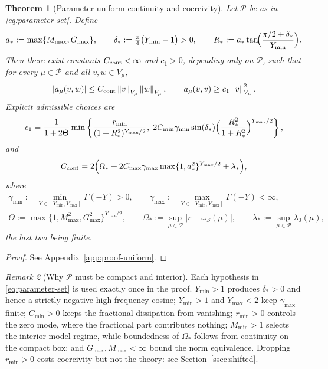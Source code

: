 \documentclass[11pt]{amsart}
\newtheorem{theorem}{Theorem}[section]
\theoremstyle{remark}
\newtheorem{remark}[theorem]{Remark}
\newcommand{\Pset}{\mathcal{P}}
\newcommand{\Vmu}{V_{\mu}}
\newcommand{\norm}[1]{\left\lVert #1\right\rVert}
\newcommand{\rf}{r}
\begin{document}
\begin{theorem}[Parameter-uniform continuity and coercivity]
\label{thm:uniform-coercivity}
Let $\Pset$ be as in \eqref{eq:parameter-set}.  Define
\begin{equation}
  a_\ast:=\max\{M_{\max},G_{\max}\},
  \qquad
  \delta_\ast:=\tfrac{\pi}{4}\bigl(Y_{\min}-1\bigr)>0,
  \qquad
  R_\ast:=a_\ast\tan\!\Bigl(\frac{\pi/2+\delta_\ast}{Y_{\min}}\Bigr).
  \label{eq:uniform-constants-aux}
\end{equation}
Then there exist constants $C_{\rm cont}<\infty$ and $c_1>0$, depending only
on $\Pset$, such that for every $\mu\in\Pset$ and all $v,w\in\Vmu$,
\begin{equation}
  |a_\mu(v,w)|\le C_{\rm cont}\norm{v}_{\Vmu}\norm{w}_{\Vmu},
  \qquad
  a_\mu(v,v)\ge c_1\norm{v}_{\Vmu}^2 .
  \label{eq:uniform-coercivity}
\end{equation}
Explicit admissible choices are
\begin{equation}
  c_1
  =\frac{1}{1+2\Theta}
  \min\left\{
    \frac{r_{\min}}{(1+R_\ast^2)^{Y_{\max}/2}},\;
    2C_{\min}\gamma_{\min}\sin(\delta_\ast)
    \Bigl(\frac{R_\ast^2}{1+R_\ast^2}\Bigr)^{Y_{\max}/2}
  \right\},
  \label{eq:c1-explicit}
\end{equation}
and
\begin{equation}
  C_{\rm cont}
  =2\Bigl(
    \Omega_\ast
    +2C_{\max}\gamma_{\max}\max\{1,a_\ast^2\}^{Y_{\max}/2}
    +\lambda_\ast
  \Bigr),
  \label{eq:Ccont-explicit}
\end{equation}
where
\begin{equation}
\begin{gathered}
\gamma_{\min}:=\!\!\min_{Y\in[Y_{\min},Y_{\max}]}\!\!\Gamma(-Y)>0,
\qquad
\gamma_{\max}:=\!\!\max_{Y\in[Y_{\min},Y_{\max}]}\!\!\Gamma(-Y)<\infty,
\\
\Theta:=\max\{1,M_{\max}^2,G_{\max}^2\}^{Y_{\max}/2},
\qquad
\Omega_\ast:=\sup_{\mu\in\Pset}|\rf-\omega_S(\mu)|,
\qquad
\lambda_\ast:=\sup_{\mu\in\Pset}\lambda_0(\mu),
\end{gathered}
\label{eq:uniform-aux-constants}
\end{equation}
the last two being finite.
\end{theorem}

\begin{proof}
See Appendix~\ref{app:proof-uniform}.
\end{proof}

\begin{remark}[Why $\Pset$ must be compact and interior]
\label{rem:why-compact}
Each hypothesis in \eqref{eq:parameter-set} is used exactly once in the proof.
$Y_{\min}>1$ produces $\delta_\ast>0$ and hence a strictly negative
high-frequency cosine; $Y_{\min}>1$ and $Y_{\max}<2$ keep $\gamma_{\max}$ finite; $C_{\min}>0$
keeps the fractional dissipation from vanishing; $r_{\min}>0$ controls the
zero mode, where the fractional part contributes nothing; $M_{\min}>1$ selects the interior model regime, while boundedness of
$\Omega_\ast$ follows from continuity on the compact box; and $G_{\max},M_{\max}<\infty$ bound the norm
equivalence.  Dropping $r_{\min}>0$ costs coercivity but not the theory: see
Section~\ref{ssec:shifted}.
\end{remark}
\end{document}

